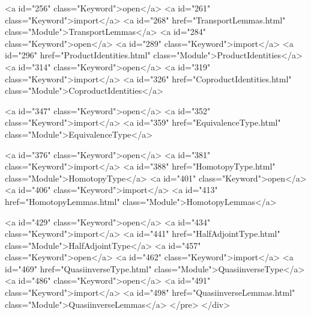 <a id="256" class="Keyword">open</a> <a id="261" class="Keyword">import</a> <a id="268" href="TransportLemmas.html" class="Module">TransportLemmas</a>
<a id="284" class="Keyword">open</a> <a id="289" class="Keyword">import</a> <a id="296" href="ProductIdentities.html" class="Module">ProductIdentities</a>
<a id="314" class="Keyword">open</a> <a id="319" class="Keyword">import</a> <a id="326" href="CoproductIdentities.html" class="Module">CoproductIdentities</a>

<a id="347" class="Keyword">open</a> <a id="352" class="Keyword">import</a> <a id="359" href="EquivalenceType.html" class="Module">EquivalenceType</a>

<a id="376" class="Keyword">open</a> <a id="381" class="Keyword">import</a> <a id="388" href="HomotopyType.html" class="Module">HomotopyType</a>
<a id="401" class="Keyword">open</a> <a id="406" class="Keyword">import</a> <a id="413" href="HomotopyLemmas.html" class="Module">HomotopyLemmas</a>

<a id="429" class="Keyword">open</a> <a id="434" class="Keyword">import</a> <a id="441" href="HalfAdjointType.html" class="Module">HalfAdjointType</a>
<a id="457" class="Keyword">open</a> <a id="462" class="Keyword">import</a> <a id="469" href="QuasiinverseType.html" class="Module">QuasiinverseType</a>
<a id="486" class="Keyword">open</a> <a id="491" class="Keyword">import</a> <a id="498" href="QuasiinverseLemmas.html" class="Module">QuasiinverseLemmas</a>
</pre>
</div>

